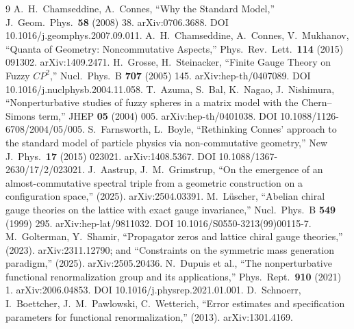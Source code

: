 \documentclass[12pt,a4paper,twoside]{article}
\theoremstyle{plain}
\theoremstyle{definition}
\theoremstyle{remark}
\begin{document}
\begin{thebibliography}{9}
A.~H.~Chamseddine, A.~Connes, ``Why the Standard Model,'' J.\ Geom.\ Phys.\ \textbf{58} (2008) 38. arXiv:0706.3688. DOI 10.1016/j.geomphys.2007.09.011.
A.~H.~Chamseddine, A.~Connes, V.~Mukhanov, ``Quanta of Geometry: Noncommutative Aspects,'' Phys.\ Rev.\ Lett.\ \textbf{114} (2015) 091302. arXiv:1409.2471.
H.~Grosse, H.~Steinacker, ``Finite Gauge Theory on Fuzzy $CP^2$,'' Nucl.\ Phys.\ B \textbf{707} (2005) 145. arXiv:hep-th/0407089. DOI 10.1016/j.nuclphysb.2004.11.058.
T.~Azuma, S.~Bal, K.~Nagao, J.~Nishimura, ``Nonperturbative studies of fuzzy spheres in a matrix model with the Chern--Simons term,'' JHEP \textbf{05} (2004) 005. arXiv:hep-th/0401038. DOI 10.1088/1126-6708/2004/05/005.
S.~Farnsworth, L.~Boyle, ``Rethinking Connes' approach to the standard model of particle physics via non-commutative geometry,'' New J.\ Phys.\ \textbf{17} (2015) 023021. arXiv:1408.5367. DOI 10.1088/1367-2630/17/2/023021.
J.~Aastrup, J.~M.~Grimstrup, ``On the emergence of an almost-commutative spectral triple from a geometric construction on a configuration space,'' (2025). arXiv:2504.03391.
M.~L\"uscher, ``Abelian chiral gauge theories on the lattice with exact gauge invariance,'' Nucl.\ Phys.\ B \textbf{549} (1999) 295. arXiv:hep-lat/9811032. DOI 10.1016/S0550-3213(99)00115-7.
M.~Golterman, Y.~Shamir, ``Propagator zeros and lattice chiral gauge theories,'' (2023). arXiv:2311.12790; and ``Constraints on the symmetric mass generation paradigm,'' (2025). arXiv:2505.20436.
N.~Dupuis et al., ``The nonperturbative functional renormalization group and its applications,'' Phys.\ Rept.\ \textbf{910} (2021) 1. arXiv:2006.04853. DOI 10.1016/j.physrep.2021.01.001.
D.~Schnoerr, I.~Boettcher, J.~M.~Pawlowski, C.~Wetterich, ``Error estimates and specification parameters for functional renormalization,'' (2013). arXiv:1301.4169.


\end{thebibliography}
\end{document}
